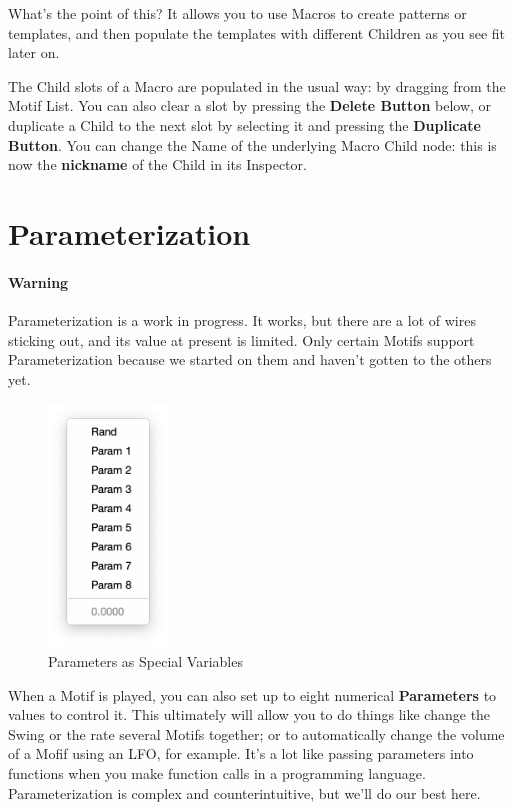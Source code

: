 \documentclass[twoside,10pt]{article}
\begin{document}
What's the point of this?  It allows you to use Macros to create patterns or templates, and then populate the templates with different Children as you see fit later on. 

The Child slots of a Macro are populated in the usual way: by dragging from the Motif List.  You can also clear a slot by pressing the {\bf Delete Button} below, or duplicate a Child to the next slot by selecting it and pressing the {\bf Duplicate Button}.  You can change the Name of the underlying Macro Child node: this is now the {\bf nickname} of the Child in its Inspector.

\clearpage\section{Parameterization}
\label{parameters}

\paragraph{\color{red} Warning}  Parameterization is a work in progress.  It works, but there are a lot of wires sticking out, and its value at present is limited.  Only certain Motifs support Parameterization because we started on them and haven't gotten to the others yet.

\vspace{1em}

\begin{figure}
\vspace{-1em}
\includegraphics[width=1.25in]{params}
\vspace{-2em}
\caption{Parameters as Special Variables}
\label{params}
\end{figure}

When a Motif is played, you can also set up to eight numerical {\bf Parameters} to values to control it.  This ultimately will allow you to do things like change the Swing or the rate several Motifs together; or to automatically change the volume of a Mofif using an LFO, for example.  It's a lot like passing parameters into functions when you make function calls in a programming language.  Parameterization is complex and counterintuitive, but we'll do our best here.
\end{document}
